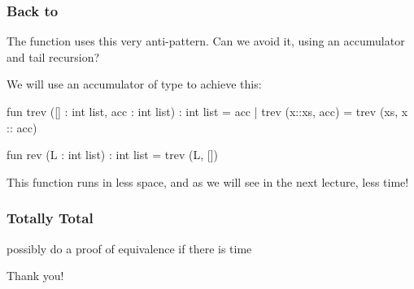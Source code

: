 \documentclass[aspectratio=169]{beamer}
\begin{document}
\begin{frame}[fragile]
  \frametitle{Back to }

  The  function uses this very anti-pattern. Can we avoid it, using an accumulator
  and tail recursion?

  \vspace{\fill}

  We will use an accumulator of type  to achieve this: 

  \begin{codeblock}
    fun trev ([] : int list, acc : int list) : int list = acc
      | trev (x::xs, acc) = trev (xs, x :: acc)

    fun rev (L : int list) : int list = trev (L, [])
  \end{codeblock}

  \vspace{\fill}

  This  function runs in less space, and as we will see in the next lecture,
  less time!
\end{frame}

\begin{frame}[fragile]
  \frametitle{Totally Total}

  possibly do a proof of equivalence if there is time
\end{frame}

\begin{frame}[plain]
\begin{center} Thank you! \end{center}
\end{frame}
\end{document}

